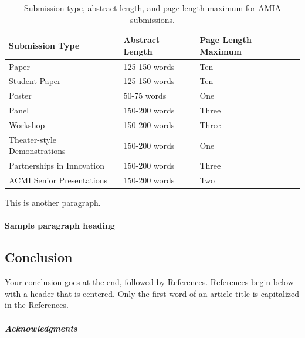 \documentclass{amia}
\begin{document}
\begin{table}[H]
\begin{center}
\begin{tabular}{|l|l|l|}
\hline
Submission Type	            &Abstract Length	&Page Length Maximum \\
\hline
Paper                       &125-150 words	    &Ten                 \\
\hline 
Student Paper	            &125-150 words	    &Ten                 \\
\hline
Poster                      &50-75 words        &One                 \\
\hline
Panel	                    &150-200 words      &Three               \\
\hline
Workshop	                &150-200 words      &Three               \\
\hline
Theater-style Demonstrations&150-200 words	    &One                 \\
\hline
Partnerships in Innovation	&150-200 words	    &Three               \\
\hline
ACMI Senior Presentations	&150-200 words	    &Two                 \\
\hline
\end{tabular}
\end{center}
\caption{Submission type, abstract length, and page length maximum for AMIA submissions.}
\label{tab:submission}
\end{table}

This is another paragraph.

\paragraph{Sample paragraph heading}\lipsum[1]

\subsection*{Conclusion}

Your conclusion goes at the end, followed by References.  References begin below with a header that is centered.  Only the first word of an article title is capitalized in the References.

\subparagraph{Acknowledgments}\lipsum[1]

\makeatletter
\renewcommand{\@biblabel}[1]{\hfill #1.}
\makeatother


  
\end{document}
